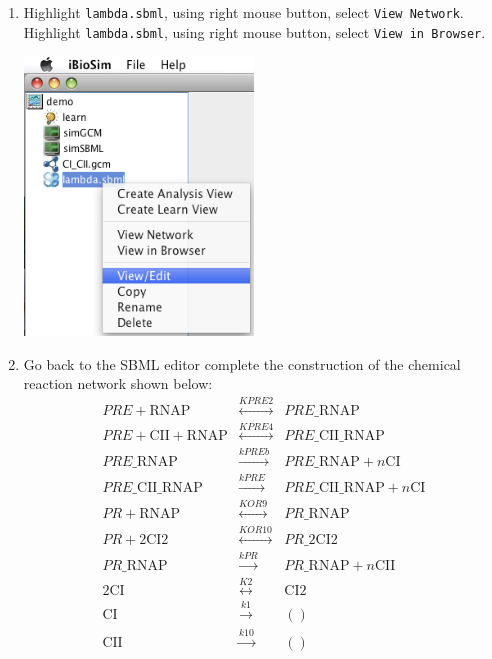 \documentclass[titlepage,11pt]{article}
\begin{document}
\begin{enumerate}
\item Highlight {\tt lambda.sbml}, using right mouse button, select 
      {\tt View Network}.
      Highlight {\tt lambda.sbml}, using right mouse button, select 
      {\tt View in Browser}.

\includegraphics[height=74mm]{screenshots/modSBML}

\item Go back to the SBML editor complete the construction of the
      chemical reaction network shown below:
\begin{eqnarray*}
PRE + \mathrm{RNAP} & \stackrel{KPRE2}{\longleftrightarrow} &
PRE\_\mathrm{RNAP} \\
PRE + \mathrm{CII} + \mathrm{RNAP} &
\stackrel{KPRE4}{\longleftrightarrow} &
PRE\_\mathrm{CII}\_\mathrm{RNAP} \\
PRE\_\mathrm{RNAP} & \stackrel{kPREb}{\longrightarrow} & 
PRE\_\mathrm{RNAP} + n\mathrm{CI} \\
PRE\_\mathrm{CII}\_\mathrm{RNAP} 
& \stackrel{kPRE}{\longrightarrow} & 
PRE\_\mathrm{CII}\_\mathrm{RNAP} + n\mathrm{CI} \\
PR + \mathrm{RNAP} & \stackrel{KOR9}{\longleftrightarrow} &
PR\_\mathrm{RNAP} \\
PR + 2 \mathrm{CI2} & \stackrel{KOR10}{\longleftrightarrow} &
PR\_2 \mathrm{CI2} \\
PR\_\mathrm{RNAP} & \stackrel{kPR}{\longrightarrow} & 
PR\_\mathrm{RNAP} + n\mathrm{CII} \\
2 \mathrm{CI} & \stackrel{K2}{\longleftrightarrow} & \mathrm{CI2} \\
\mathrm{CI} & \stackrel{k1}{\longrightarrow} & () \\ 
\mathrm{CII} & \stackrel{k10}{\longrightarrow} & ()
\end{eqnarray*}


\end{enumerate}
\end{document}
